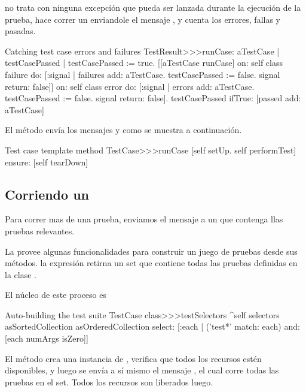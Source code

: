 \documentclass[a4paper,10pt,twoside]{book}
\begin{document}
 no trata con ninguna excepci\'on que pueda ser
lanzada durante la ejecuci\'on de la prueba, hace correr un enviandole el mensaje
, y cuenta los errores, fallas y pasadas.

\begin{method}[testresultruncase]{Catching test case errors and failures}
TestResult>>>runCase: aTestCase
	| testCasePassed |
	testCasePassed := true.
	[[aTestCase runCase] 
			on: self class failure
			do: 
				[:signal | 
				failures add: aTestCase.
				testCasePassed := false.
				signal return: false]]
					on: self class error
					do:
						[:signal |
						errors add: aTestCase.
						testCasePassed := false.
						signal return: false].
	testCasePassed ifTrue: [passed add: aTestCase]
\end{method}

El m\'etodo   env\'ia  los mensajes  y 
como se muestra a continuaci\'on. 

\begin{method}[testcaseruncase]{Test case template method}
TestCase>>>runCase
	[self setUp.
	self performTest] ensure: [self tearDown]
\end{method}

\subsection{Corriendo un }

Para correr mas de una prueba, enviamos el mensaje  a un  que contenga
llas pruebas relevantes.

La  provee algunas funcionalidades para construir un juego de pruebas desde sus m\'etodos.
la expresi\'on  retirna un set que contiene todas las 
pruebas definidas en la clase  .

El n\'ucleo de este proceso es
\begin{method}[testcasetestselectors]{Auto-building the test suite}
TestCase class>>>testSelectors 
	^self selectors asSortedCollection asOrderedCollection select: [:each | 
		('test*' match: each) and: [each numArgs isZero]]
\end{method}

El m\'etodo  crea una instancia de , verifica que todos los
recursos est\'en disponibles, y luego se env\'ia a s\'i mismo el mensaje , 
el cual corre todas las pruebas en el set. Todos los recursos son liberados luego.
\end{document}
